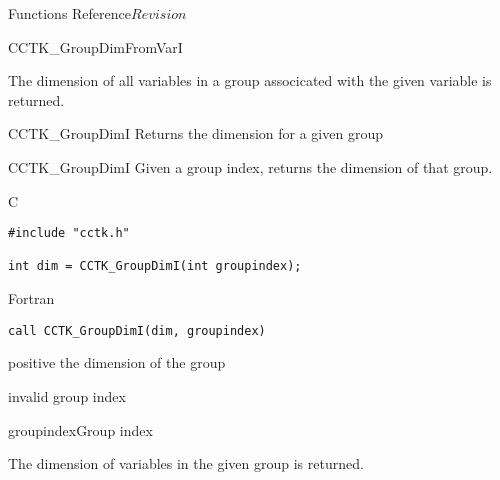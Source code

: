 \begin{cactuspart}{ Functions Reference}{}{$Revision$}
\begin{FunctionDescription}{CCTK\_GroupDimFromVarI}
\begin{Discussion}
The dimension of all variables in a group associcated with the given variable is returned.
\end{Discussion}

\begin{SeeAlsoSection}
\begin{SeeAlso}{CCTK\_GroupDimI}
Returns the dimension for a given group
\end{SeeAlso}
\end{SeeAlsoSection}
\end{FunctionDescription}

\begin{FunctionDescription}{CCTK\_GroupDimI}
\label{CCTK-GroupDimI}
Given a group index, returns the dimension of that group.

\begin{SynopsisSection}
\begin{Synopsis}{C}
\begin{verbatim}
#include "cctk.h"

int dim = CCTK_GroupDimI(int groupindex);
\end{verbatim}
\end{Synopsis}
\begin{Synopsis}{Fortran}
\begin{verbatim}
call CCTK_GroupDimI(dim, groupindex)
\end{verbatim}
\end{Synopsis}
\end{SynopsisSection}

\begin{ResultSection}
\begin{Result}{positive} the dimension of the group\end{Result}
\begin{Result}{-1} invalid group index \end{Result}
\end{ResultSection}

\begin{ParameterSection}
\begin{Parameter}{groupindex}Group index\end{Parameter}
\end{ParameterSection}

\begin{Discussion}
The dimension of variables in the given group is returned.
\end{Discussion}


\end{FunctionDescription}
\end{cactuspart}
